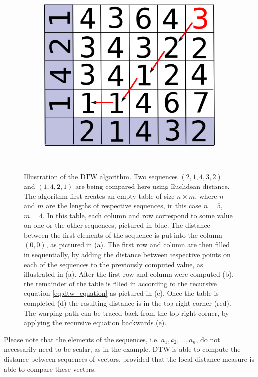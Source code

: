\documentclass[parskip]{cs4rep}
\begin{document}
\begin{figure}
\begin{subfigure}[b]{0.3\textwidth}
       \includegraphics[width=\textwidth]{figures/DTW/worked-out/step-5.png}
       \caption{}
       \label{fig:DTW:example:5}
   \end{subfigure}
   ~
   \caption{Illustration of the DTW algorithm. Two sequences $(2,1,4,3,2)$ and $(1,4,2,1)$ are being compared here using Euclidean distance. The algorithm first creates an empty table of size $n \times m$, where $n$ and $m$ are the lengths of respective sequences, in this case $n=5$, $m=4$. In this table, each column and row correspond to some value on one or the other sequences, pictured in blue.
The distance between the first elements of the sequence is put into the column $(0,0)$, as pictured in (a). The first row and column are then filled in sequentially, by adding the distance between respective points on each of the sequences to the previously computed value, as illustrated in (a). After the first row and column were computed (b), the remainder of the table is filled in according to the recursive equation \ref{eq:dtw_equation} as pictured in (c). Once the table is completed (d) the resulting distance is in the top-right corner (red). The warping path can be traced back from the top right corner, by applying the recursive equation backwards (e).}
   
   \label{fig:DTW:example}
\end{figure}


Please note that the elements of the sequences, i.e. $a_1, a_2, ..., a_n$, do not necessarily need to be scalar, as in the example. DTW is able to compute the distance between sequences of vectors, provided that the local distance measure is able to compare these vectors. 
\end{document}
